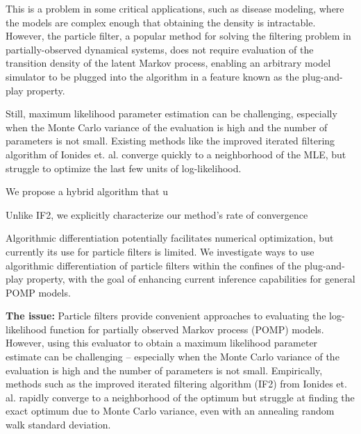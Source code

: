 \documentclass[9pt,twocolumn,twoside]{pnas-new}
\begin{document}
This is a problem in some critical applications, such as disease modeling, where the models are complex enough that obtaining the density is intractable. However, the particle filter, a popular method for solving the filtering problem in partially-observed dynamical systems, does not require evaluation of the transition density of the latent Markov process, enabling an arbitrary model simulator to be plugged into the algorithm in a feature known as the plug-and-play property. 

Still, maximum likelihood parameter estimation can be challenging, especially when the Monte Carlo variance of the evaluation is high and the number of parameters is not small. Existing methods like the improved iterated filtering algorithm of Ionides et. al. \cite{ionides15} converge quickly to a neighborhood of the MLE, but struggle to optimize the last few units of log-likelihood. 




We propose a hybrid algorithm that u

Unlike IF2, we explicitly characterize our method's rate of convergence



Algorithmic differentiation potentially facilitates numerical optimization, but currently its use for particle filters is limited. We investigate ways to use algorithmic differentiation of particle filters within the confines of the plug-and-play property, with the goal of enhancing current inference capabilities for general POMP models.


\textbf{The issue:} Particle filters provide convenient approaches to evaluating the log-likelihood function for partially observed Markov process (POMP) models. However, using this evaluator to obtain a maximum likelihood parameter estimate can be challenging -- especially when the Monte Carlo variance of the evaluation is high and the number of parameters is not small. Empirically, methods such as the improved iterated filtering algorithm (IF2) from Ionides et. al. \cite{ionides15} rapidly converge to a neighborhood of the optimum but struggle at finding the exact optimum due to Monte Carlo variance, even with an annealing random walk standard deviation. 
\end{document}
